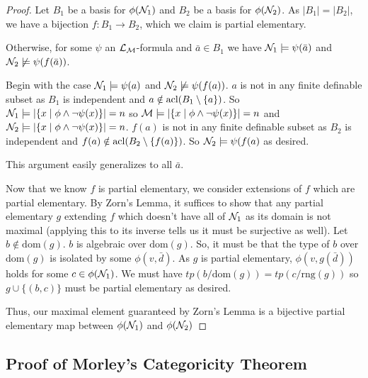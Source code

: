 \begin{proof}
Let \(B_1\) be a basis for \(\phi(\mathcal{N}_1)\) and \(B_2\) be a basis for \(\phi(\mathcal{N}_2)\).
As \(|B_1| = |B_2|\), we have a bijection \(f: B_1 \to B_2\), which we claim is partial elementary. 

Otherwise, for some \(\psi\) an \(\mathcal{L}_{\mathcal{M}}\)-formula and \(\bar{a} \in B_1\) we have \(\mathcal{N}_1 \models \psi(\bar{a})\) and \(\mathcal{N}_2 \not\models \psi(f(\bar{a}))\). 

Begin with the case \(\mathcal{N}_1 \models \psi(a)\) and \(\mathcal{N}_2 \not \models \psi(f(a))\). 
\(a\) is not in any finite definable subset as \(B_1\) is independent and \(a \notin \text{acl}(B_1 \setminus\{a\})\). 
So \(\mathcal{N}_1 \models |\{x \mid \phi \land \neg \psi(x)\}| = n\) so \(\mathcal{M} \models |\{x \mid \phi \land \neg \psi(x)\}| = n\)
and \(\mathcal{N}_2 \models |\{x \mid \phi \land \neg \psi(x)\}| = n\).
\(f(a)\) is not in any finite definable subset as \(B_2\) is independent and \(f(a) \notin \text{acl}(B_2 \setminus\{f(a)\})\). 
So \(\mathcal{N}_2 \models \psi(f(a)\) as desired. 

This argument easily generalizes to all \(\bar{a}\). 

Now that we know \(f\) is partial elementary, we consider extensions of \(f\) which are partial elementary. 
By Zorn's Lemma, it suffices to show that any partial elementary \(g\) extending \(f\) which doesn't have all of \(\mathcal{N}_1\) as its domain is not maximal (applying this to its inverse tells us it must be surjective as well).
Let \(b \notin \text{dom}(g)\). \(b\) is algebraic over \(\text{dom}(g)\). %
So, it must be that the type of \(b\) over \(\text{dom}(g)\) is isolated by some \(\phi(v, \bar{d})\).
As \(g\) is partial elementary, \(\phi(v, g(\bar{d}))\) holds for some \(c \in \phi(\mathcal{N}_1)\).  %
We must have \(tp(b/\text{dom}(g)) = tp (c/\text{rng}(g))\) so \(g \cup \{(b, c)\}\) must be partial elementary as desired. 

Thus, our maximal element guaranteed by Zorn's Lemma is a bijective partial elementary map between \(\phi(\mathcal{N}_1)\) and  \(\phi(\mathcal{N}_2)\)
\end{proof}

\subsection{Proof of Morley's Categoricity Theorem}

